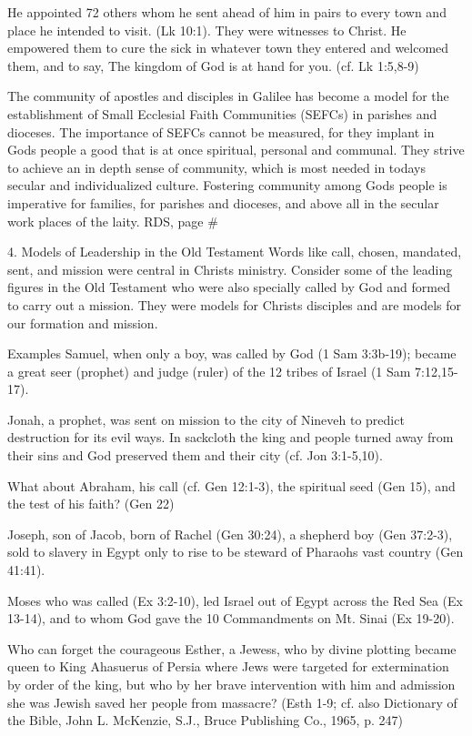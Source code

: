 \documentclass[oneside]{book}
\begin{document}
He appointed 72 others whom he sent ahead of him in pairs to every town and
place he intended to visit. (Lk 10:1). They were witnesses to Christ. He
empowered them to cure the sick in whatever town they entered and welcomed them,
and to say, The kingdom of God is at hand for you. (cf. Lk 1:5,8-9)

The community of apostles and disciples in Galilee has become a model for the
establishment of Small Ecclesial Faith Communities (SEFCs) in parishes and
dioceses. The importance of SEFCs cannot be measured, for they implant in Gods
people a good that is at once spiritual, personal and communal. They strive to
achieve an in depth sense of community, which is most needed in todays secular
and individualized culture. Fostering community among Gods people is imperative
for families, for parishes and dioceses, and above all in the secular work
places of the laity.  RDS, page \#

4. Models of Leadership in the Old Testament Words like call, chosen, mandated,
sent, and mission were central in Christs ministry. Consider some of the leading
figures in the Old Testament who were also specially called by God and formed to
carry out a mission. They were models for Christs disciples and are models for
our formation and mission.

Examples Samuel, when only a boy, was called by God (1 Sam 3:3b-19); became a
great seer (prophet) and judge (ruler) of the 12 tribes of Israel (1 Sam
7:12,15-17).

Jonah, a prophet, was sent on mission to the city of Nineveh to predict
destruction for its evil ways. In sackcloth the king and people turned away from
their sins and God preserved them and their city (cf. Jon 3:1-5,10).

What about Abraham, his call (cf. Gen 12:1-3), the spiritual seed (Gen 15), and
the test of his faith? (Gen 22)

Joseph, son of Jacob, born of Rachel (Gen 30:24), a shepherd boy (Gen 37:2-3),
sold to slavery in Egypt only to rise to be steward of Pharaohs vast country
(Gen 41:41).

Moses who was called (Ex 3:2-10), led Israel out of Egypt across the Red Sea (Ex
13-14), and to whom God gave the 10 Commandments on Mt. Sinai (Ex 19-20).

Who can forget the courageous Esther, a Jewess, who by divine plotting became
queen to King Ahasuerus of Persia where Jews were targeted for extermination by
order of the king, but who by her brave intervention with him and admission she
was Jewish saved her people from massacre? (Esth 1-9; cf. also Dictionary of the
Bible, John L. McKenzie, S.J., Bruce Publishing Co., 1965, p. 247)
\end{document}
